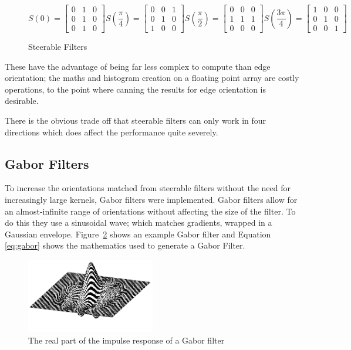 \begin{figure}[h]
$$
S\left(0\right) = 
\begin{bmatrix}
0 & 1 & 0 \\
0 & 1 & 0 \\
0 & 1 & 0
\end{bmatrix}
S\left(\frac{\pi}{4}\right) =
\begin{bmatrix}
0 & 0 & 1 \\
0 & 1 & 0 \\
1 & 0 & 0
\end{bmatrix}
S\left(\frac{\pi}{2}\right) = 
\begin{bmatrix}
0 & 0 & 0 \\
1 & 1 & 1 \\
0 & 0 & 0
\end{bmatrix}
S\left(\frac{3\pi}{4}\right) = 
\begin{bmatrix}
1 & 0 & 0 \\
0 & 1 & 0 \\
0 & 0 & 1
\end{bmatrix}
$$
\caption{Steerable Filters}
\label{fig:steerable-filters}
\end{figure}

These have the advantage of being far less complex to compute than edge orientation; the maths and
histogram creation on a floating point array are costly operations, to the point where
canning the results for edge orientation is desirable.

There is the obvious trade off that steerable filters can only work in four directions which
does affect the performance quite severely.

\subsection{Gabor Filters}
To increase the orientations matched from steerable filters without the need for increasingly 
large kernels, Gabor filters\cite{Daugman1985Uncertainty} were implemented. Gabor filters allow
for an almost-infinite range of orientations without affecting the size of the filter. To do this
they use a sinusoidal wave; which matches gradients, wrapped in a Gaussian envelope. Figure~\ref{fig:gabor}
shows an example Gabor filter and Equation \ref{eq:gabor} shows the mathematics used to generate a Gabor Filter.

\begin{figure}[h]
\centering
\includegraphics[width=0.5\textwidth]{img/gabor-real}
\caption{The real part of the impulse response of a Gabor filter\cite{Trapp1998Gabor}}\label{fig:gabor}
\end{figure}

